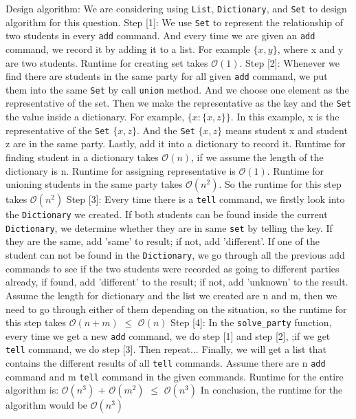 \documentclass{assignment-263}
\begin{document}
\begin{enumerate}
\newpage
Design algorithm:\vskip5pt
We are considering using \verb|List|, \verb|Dictionary|, and \verb|Set| to design algorithm for this question. \vskip5pt
Step [1]:  We use \verb|Set| to represent the relationship of two students in every \verb|add| command. And every time we are given an \verb|add| command, we record it by adding it to a list. For example $\{x,y\}$, where x and y are two students. Runtime for creating set takes $\mathcal{O}(1)$. \vskip5pt
Step [2]: Whenever we find there are students in the same party for all given \verb|add| command, we put them into the same \verb|Set| by call \verb|union| method. And we choose one element as the representative of the set. Then we make the representative as the key and the \verb|Set| the value inside a dictionary. For example, $\{x:\{x,z\}\}$. In this example, x is the representative of the \verb|Set| $\{x,z\}$. And the \verb|Set| $\{x,z\}$ means student x and student z are in the same party. Lastly, add it into a dictionary to record it. Runtime for finding student in a dictionary takes $\mathcal{O}(n)$, if we assume the length of the dictionary is n. Runtime for assigning representative is $\mathcal{O}(1)$. Runtime for unioning students in the same party takes $\mathcal{O}(n^2)$. So the runtime for this step takes $\mathcal{O}(n^2)$\vskip5pt
Step [3]: Every time there is a \verb|tell| command, we firstly look into the \verb|Dictionary| we created. If both students can be found inside the current \verb|Dictionary|, we determine whether they are in same \verb|set| by telling the key. If they are the same, add 'same' to result; if not, add 'different'. If one of the student can not be found in the \verb|Dictionary|, we go through all the previous add commands to see if the two students were recorded as going to different parties already, if found, add 'different' to the result; if not, add 'unknown' to the result. Assume the length for dictionary and the list we created are n and m, then we need to go through either of them depending on the situation, so the runtime for this step takes $\mathcal{O}(n+m)$ $\le$ $\mathcal{O}(n)$\vskip5pt
Step [4]: In the \verb|solve_party| function, every time we get a new \verb|add| command, we do step [1] and step [2], ;if we get \verb|tell| command, we do step [3]. Then repeat... Finally, we will get a list that contains the different results of all \verb|tell| commands. Assume there are n \verb|add| command and m \verb|tell| command in the given commands. Runtime for the entire algorithm is: $\mathcal{O}(n^3)$ + $\mathcal{O}(m^2)$ $\le$ $\mathcal{O}(n^3)$ \vskip5pt
In conclusion, the runtime for the algorithm would be $\mathcal{O}(n^3)$




\end{enumerate}
\end{document}
